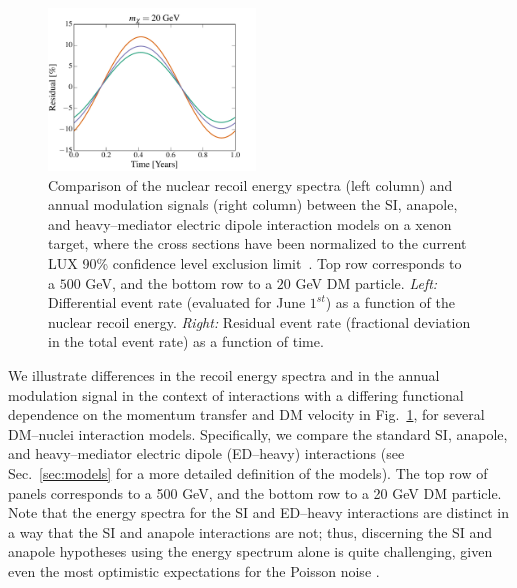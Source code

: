\documentclass[11pt, a4paper]{article}
\newcommand{\Sec}[1]{Sec.~\ref{#1}} \newcommand{\Secs}[2]{Secs.~\ref{#1} and \ref{#2}} \newcommand{\Secm}[2]{Secs.~\ref{#1} through \ref{#2}}
\newcommand{\Fig}[1]{Fig.~\ref{#1}} \newcommand{\Figs}[2]{Figs.~\ref{#1} and \ref{#2}}
\begin{document}
\begin{figure}
\includegraphics[width=0.49\textwidth, trim=0.cm 0.0cm 0.cm 0.0cm,clip=true]{plots/Xenon_SIvsAnapole_20GeV_Residual_Theory.pdf}
\caption{\label{fig:diff_rate_comp}
Comparison of the nuclear recoil energy spectra (left column) and annual modulation signals (right column) between the SI, anapole, and heavy--mediator electric dipole interaction models on a xenon target, where the cross sections have been normalized to the current LUX 90\% confidence level exclusion limit~\cite{Akerib:2016vxi}. Top row corresponds to a $500$ GeV, and the bottom row to a $20$ GeV DM particle. \emph{Left:} Differential event rate (evaluated for June $1^{st}$) as a function of the nuclear recoil energy. \emph{Right:} Residual event rate (fractional deviation in the total event rate) as a function of time.}
\end{figure}

We illustrate differences in the recoil energy spectra and in the annual modulation signal in the context of interactions with a differing functional dependence on the momentum transfer and DM velocity in \Fig{fig:diff_rate_comp}, for several DM--nuclei interaction models. Specifically, we compare the standard SI, anapole, and heavy--mediator electric dipole (ED--heavy) interactions (see \Sec{sec:models} for a more detailed definition of the models). The top row of panels corresponds to a 500 GeV, and the bottom row to a 20 GeV DM particle.  Note that the energy spectra for the SI and ED--heavy interactions are distinct in a way that the SI and anapole interactions are not; thus, discerning the SI and anapole hypotheses using the energy spectrum alone is quite challenging, given even the most optimistic expectations for the Poisson noise \cite{Gluscevic:2015sqa}. 
\end{document}
